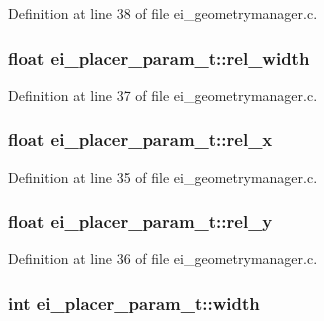 Definition at line 38 of file ei\-\_\-geometrymanager.\-c.

\hypertarget{structei__placer__param__t_aac042b88d4f7c449ab9b47faf29d81a7}{
\subsubsection[{rel\-\_\-width}]{\setlength{\rightskip}{0pt plus 5cm}float ei\-\_\-placer\-\_\-param\-\_\-t\-::rel\-\_\-width}}\label{structei__placer__param__t_aac042b88d4f7c449ab9b47faf29d81a7}


Definition at line 37 of file ei\-\_\-geometrymanager.\-c.

\hypertarget{structei__placer__param__t_a3d5ab41b84ea32b97567bd98fabb1998}{
\subsubsection[{rel\-\_\-x}]{\setlength{\rightskip}{0pt plus 5cm}float ei\-\_\-placer\-\_\-param\-\_\-t\-::rel\-\_\-x}}\label{structei__placer__param__t_a3d5ab41b84ea32b97567bd98fabb1998}


Definition at line 35 of file ei\-\_\-geometrymanager.\-c.

\hypertarget{structei__placer__param__t_ae1c983cf1add3c3f6e8a61e536a87134}{
\subsubsection[{rel\-\_\-y}]{\setlength{\rightskip}{0pt plus 5cm}float ei\-\_\-placer\-\_\-param\-\_\-t\-::rel\-\_\-y}}\label{structei__placer__param__t_ae1c983cf1add3c3f6e8a61e536a87134}


Definition at line 36 of file ei\-\_\-geometrymanager.\-c.

\hypertarget{structei__placer__param__t_ada4185fa077dbc3a30e5ee97b5e0b50f}{
\subsubsection[{width}]{\setlength{\rightskip}{0pt plus 5cm}int ei\-\_\-placer\-\_\-param\-\_\-t\-::width}}\label{structei__placer__param__t_ada4185fa077dbc3a30e5ee97b5e0b50f}


